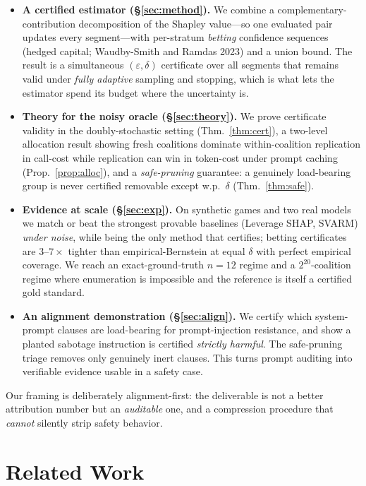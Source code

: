 \documentclass[10pt,twocolumn,letterpaper]{article}
\theoremstyle{plain}
\theoremstyle{definition}
\begin{document}
\begin{itemize}
\item \textbf{A certified estimator (\S\ref{sec:method}).} We combine a
complementary-contribution decomposition of the Shapley value---so one evaluated
pair updates every segment---with per-stratum \emph{betting} confidence
sequences (hedged capital; Waudby-Smith and Ramdas 2023) and a union bound. The
result is a simultaneous $(\varepsilon,\delta)$ certificate over all segments
that remains valid under \emph{fully adaptive} sampling and stopping, which is
what lets the estimator spend its budget where the uncertainty is.
\item \textbf{Theory for the noisy oracle (\S\ref{sec:theory}).} We prove
certificate validity in the doubly-stochastic setting (Thm.~\ref{thm:cert}), a
two-level allocation result showing fresh coalitions dominate within-coalition
replication in call-cost while replication can win in token-cost under prompt
caching (Prop.~\ref{prop:alloc}), and a \emph{safe-pruning} guarantee: a
genuinely load-bearing group is never certified removable except w.p.\ $\delta$
(Thm.~\ref{thm:safe}).
\item \textbf{Evidence at scale (\S\ref{sec:exp}).} On synthetic games and two
real models we match or beat the strongest provable baselines (Leverage SHAP,
SVARM) \emph{under noise}, while being the only method that certifies; betting
certificates are $3$--$7\times$ tighter than empirical-Bernstein at equal
$\delta$ with perfect empirical coverage. We reach an exact-ground-truth $n{=}12$
regime and a $2^{20}$-coalition regime where enumeration is impossible and the
reference is itself a certified gold standard.
\item \textbf{An alignment demonstration (\S\ref{sec:align}).} We certify which
system-prompt clauses are load-bearing for prompt-injection resistance, and
show a planted sabotage instruction is certified \emph{strictly harmful}. The
safe-pruning triage removes only genuinely inert clauses. This turns prompt
auditing into verifiable evidence usable in a safety case.
\end{itemize}

Our framing is deliberately alignment-first: the deliverable is not a better
attribution number but an \emph{auditable} one, and a compression procedure that
\emph{cannot} silently strip safety behavior.

\section{Related Work}
\end{document}
